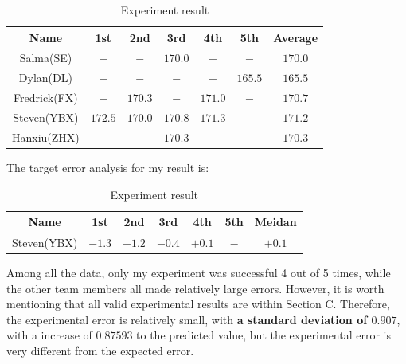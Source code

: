 \documentclass{article}
\begin{document}
    \begin{table}[H]
        \caption {Experiment result} \label{tb:e_result} 
        \begin{center}
            \begin{tabular}{ccccccc}
                \hline
                Name & 1st & 2nd & 3rd & 4th & 5th & Average \\
                \hline
                Salma(SE)       &$-$        &$-$        &$170.0$    &$-$        &$-$        &$170.0$        \\
                Dylan(DL)       &$-$        &$-$        &$-$        &$-$        &$165.5$    &$165.5$        \\
                Fredrick(FX)    &$-$        &$170.3$    &$-$        &$171.0$        &$-$    &$170.7$        \\
                Steven(YBX)     &$172.5$    &$170.0$    &$170.8$    &$171.3$    &$-$        &$171.2$        \\
                Hanxiu(ZHX)     &$-$        &$-$        &$170.3$   &$-$        &$-$        &$170.3$       \\
                \hline
            \end{tabular}
        \end{center}
    \end{table}
    The target error analysis for my result is:
    \begin{table}[H]
        \caption {Experiment result} \label{tb:e_result} 
        \begin{center}
            \begin{tabular}{ccccccc}
                \hline
                Name & 1st & 2nd & 3rd & 4th & 5th & Meidan \\
                \hline
                Steven(YBX) & $-1.3$   & $+1.2$  & $-0.4$   & $+0.1$ & $-$     & $+0.1$         \\
                \hline
            \end{tabular}
        \end{center}
    \end{table}
    Among all the data, only my experiment was successful 4 out of 5 times, while the other team members all made relatively large errors. However, it is worth mentioning that all valid experimental results are within Section C. Therefore, the experimental error is relatively small, with \textbf{a standard deviation of $0.907$}, with a increase of $0.87593$ to the predicted value, but the experimental error is very different from the expected error.
\end{document}
